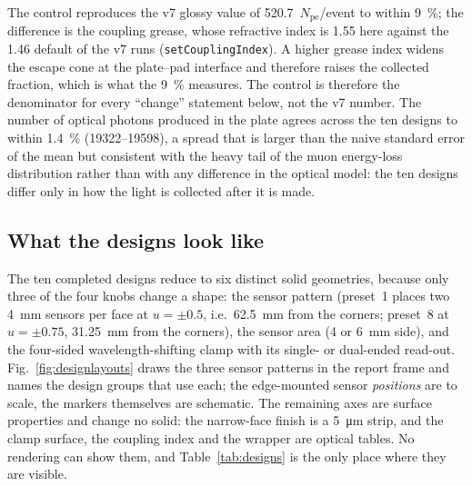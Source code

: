 \documentclass[11pt,a4paper]{article}
\newcommand{\pe}{\ensuremath{N_{\mathrm{pe}}}}
\begin{document}
The control reproduces the v7 glossy value of \num{520.7}~\pe/event to within
\SI{+9}{\percent}; the difference is the coupling grease, whose refractive
index is \num{1.55} here against the \num{1.46} default of the v7 runs
(\texttt{setCouplingIndex}). A higher grease index widens the escape cone at
the plate--pad interface and therefore raises the collected fraction, which is
what the \SI{9}{\percent} measures. The control is therefore the
denominator for every ``change'' statement below, not the v7 number. The
number of optical photons produced in the plate agrees across the ten designs
to within \SI{1.4}{\percent} (\num{19322}--\num{19598}), a spread that is
larger than the naive standard error of the mean but consistent with the
heavy tail of the muon energy-loss distribution rather than with any
difference in the optical model: the ten designs differ only in how the light
is collected after it is made.

\subsection{What the designs look like}
\label{sec:design-geometry}

The ten completed designs reduce to six distinct solid geometries, because only
three of the four knobs change a shape: the sensor pattern (preset~1 places two
\SI{4}{\milli\meter} sensors per face at $u=\pm0.5$, i.e.\ \SI{62.5}{\milli\meter}
from the corners; preset~8 at $u=\pm0.75$, \SI{31.25}{\milli\meter} from the
corners), the sensor area (\SI{4}{} or \SI{6}{\milli\meter} side), and the
four-sided wavelength-shifting clamp with its single- or dual-ended read-out.
Fig.~\ref{fig:designlayouts} draws the three sensor patterns in the report
frame and names the design groups that use each; the edge-mounted sensor
\emph{positions} are to scale, the markers themselves are schematic. The
remaining axes are surface properties and change no solid: the narrow-face
finish is a \SI{5}{\micro\meter} strip, and the clamp surface, the coupling
index and the wrapper are optical tables. No rendering can show them, and
Table~\ref{tab:designs} is the only place where they are visible.
\end{document}
